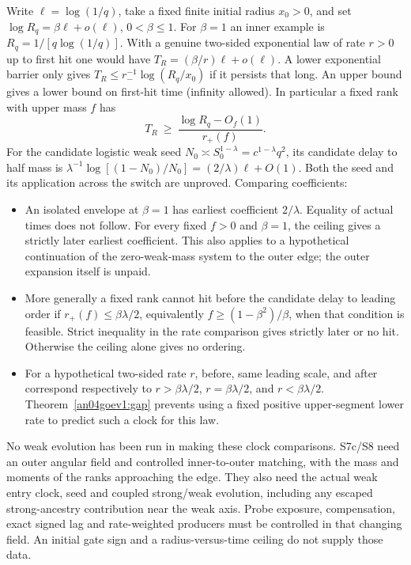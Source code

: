 \documentclass[11pt]{article}
\begin{document}
Write \(\ell=\log(1/q)\), take a fixed finite initial radius \(x_0>0\),
and set \(\log R_q=\beta\ell+o(\ell)\), \(0<\beta\le1\).
For \(\beta=1\) an inner example is \(R_q=1/[q\log(1/q)]\).
With a genuine two-sided exponential law of rate \(r>0\) up to
first hit one would have \(T_R=(\beta/r)\ell+o(\ell)\).
A lower exponential barrier only gives
\(T_R\le r_-^{-1}\log(R_q/x_0)\) if it persists that long.
An upper bound gives a lower bound on first-hit time (infinity
allowed). In particular a fixed rank with upper mass \(f\) has
\[
 T_R\ \ge\ \frac{\log R_q-O_f(1)}{r_+(f)} .
\]
For the candidate logistic weak seed \(N_0\asymp
S_0^{1-\lambda}=c^{1-\lambda}q^2\), its candidate delay to
half mass is \(\lambda^{-1}\log[(1-N_0)/N_0]
=(2/\lambda)\ell+O(1)\). Both the seed and its application across
the switch are unproved. Comparing coefficients:
\begin{itemize}
\item An isolated envelope at \(\beta=1\) has earliest coefficient
\(2/\lambda\). Equality of actual times does not follow.
For every fixed \(f>0\) and \(\beta=1\), the ceiling gives a strictly
later earliest coefficient. This also applies to a hypothetical
continuation of the zero-weak-mass system to the outer edge; the
outer expansion itself is unpaid.
\item More generally a fixed rank cannot hit before the candidate
delay to leading order if \(r_+(f)\le\beta\lambda/2\), equivalently
\(f\ge(1-\beta^2)/\beta\), when that condition is feasible.
Strict inequality in the rate comparison gives strictly later or
no hit. Otherwise the ceiling alone gives no ordering.
\item For a hypothetical two-sided rate \(r\), before, same leading
scale, and after correspond respectively to \(r>\beta\lambda/2\),
\(r=\beta\lambda/2\), and \(r<\beta\lambda/2\).
Theorem~\ref{an04goev1:gap} prevents using a fixed positive
upper-segment lower rate to predict such a clock for this law.
\end{itemize}
No weak evolution has been run in making these clock comparisons.
S7c/S8 need an outer angular field and controlled inner-to-outer
matching, with the mass and moments of the ranks approaching the
edge. They also need the actual weak entry clock, seed and coupled
strong/weak evolution, including any escaped strong-ancestry contribution
near the weak axis. Probe exposure, compensation, exact signed lag and
rate-weighted producers must be controlled in that changing field.
An initial gate sign and a radius-versus-time ceiling do not supply
those data.
\end{document}
